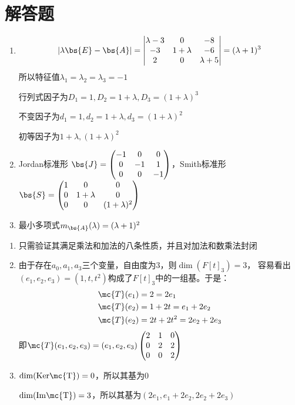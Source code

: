 \section{解答题}
\begin{enumerate}
\item \begin{align*}
|\lambda \bs{E}-\bs{A}|=\begin{vmatrix}
    \lambda-3 &0 &-8 \\
    -3 & 1+\lambda & -6 \\
    2 &0 &\lambda +5
\end{vmatrix}=(\lambda+1)^3
\end{align*}
所以特征值$\lambda_1=\lambda_2=\lambda_3=-1$

行列式因子为$D_1=1,D_2=1+\lambda,D_3=(1+\lambda)^3$

不变因子为$d_1=1,d_2=1+\lambda,d_3=(1+\lambda)^2$

初等因子为$1+\lambda,(1+\lambda)^2$

\item Jordan标准形
$\bs{J}=\begin{pmatrix}
    -1 & 0 & 0\\
    0& -1 & 1 \\
    0& 0 & -1
\end{pmatrix}$，Smith标准形$\bs{S}=\begin{pmatrix}
    1 & 0 & 0\\
    0& 1+\lambda & 0 \\
    0& 0 & (1+\lambda)^2
\end{pmatrix}$

\item 最小多项式$m_{\bs{A}}(\lambda)=(\lambda+1)^2$
\end{enumerate}


\begin{enumerate}
\item 只需验证其满足乘法和加法的八条性质，并且对加法和数乘法封闭
\item 由于存在$a_0,a_1,a_3$三个变量，自由度为3，则$\dim{(F[t]_3)}=3$，
容易看出$(e_1,e_2,e_3)=(1,t,t^2)$构成了$F[t]_3$中的一组基。于是：
\begin{align*}
\mc{T}(e_1)&=2=2e_1 \\
\mc{T}(e_2)&=1+2t=e_1+2e_2 \\
\mc{T}(e_2)&=2t+2t^2=2e_2+2e_3
\end{align*}
即$\mc{T}(e_1,e_2,e_3)=(e_1,e_2,e_3)
\begin{pmatrix}
2 & 1 & 0 \\
0 & 2 & 2 \\
0 & 0 & 2      
\end{pmatrix}$

\item $\dim(\rm{Ker}\mc{T})=0$，所以其基为0

$\dim(\rm{Im}\mc{T})=3$，所以其基为$(2e_1,e_1+2e_2,2e_2+2e_3)$

\end{enumerate}

